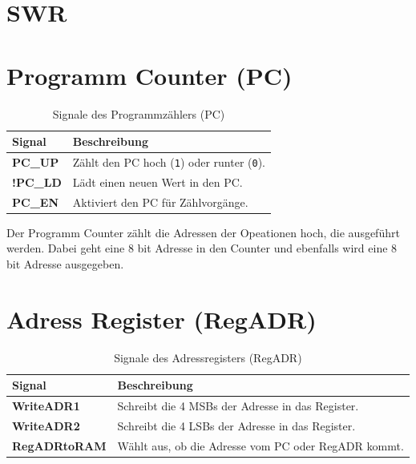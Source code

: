 \section{SWR}
\label{sec:SWR}

\section{Programm Counter (PC)}
\label{sec:programm-counter}

\begin{table}[H]
  \centering
  \begin{tabular}{|l|p{10cm}|}
    \hline
    \textbf{Signal}  & \textbf{Beschreibung}                                    \\ \hline
    \textbf{PC\_UP}  & Zählt den PC hoch (\texttt{1}) oder runter (\texttt{0}). \\ \hline
    \textbf{!PC\_LD} & Lädt einen neuen Wert in den PC.                         \\ \hline
    \textbf{PC\_EN}  & Aktiviert den PC für Zählvorgänge.                       \\ \hline
  \end{tabular}
  \caption{Signale des Programmzählers (PC)}
\end{table}

Der Programm Counter zählt die Adressen der Opeationen hoch, die ausgeführt werden. Dabei geht eine 8 bit Adresse in den Counter und ebenfalls wird eine 8 bit Adresse ausgegeben.


\section{Adress Register (RegADR)}
\label{sec: adress-register}

\begin{table}[H]
  \centering
  \begin{tabular}{|l|p{10cm}|}
    \hline
    \textbf{Signal}      & \textbf{Beschreibung}                               \\ \hline
    \textbf{WriteADR1}   & Schreibt die 4 MSBs der Adresse in das Register.    \\ \hline
    \textbf{WriteADR2}   & Schreibt die 4 LSBs der Adresse in das Register.    \\ \hline
    \textbf{RegADRtoRAM} & Wählt aus, ob die Adresse vom PC oder RegADR kommt. \\ \hline
  \end{tabular}
  \caption{Signale des Adressregisters (RegADR)}
\end{table}


